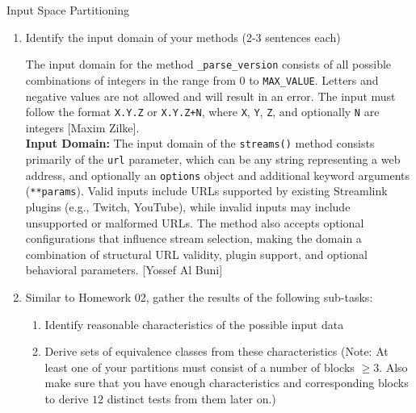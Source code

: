 \documentclass[a4paper]{scrreprt}
\newcounter{question}
\begin{document}
\begin{question}{Input Space Partitioning}
\begin{enumerate}[topsep=0pt, leftmargin=*]
\begin{answer}



          \end{answer}

    \item Identify the input domain of your methods (2-3 sentences each)
          \begin{answer}
      

The input domain for the method \texttt{\_parse\_version} consists of all possible combinations of integers in the range from 0 to \texttt{MAX\_VALUE}. Letters and negative values are not allowed and will result in an error. The input must follow the format \texttt{X.Y.Z} or \texttt{X.Y.Z+N}, where \texttt{X}, \texttt{Y}, \texttt{Z}, and optionally \texttt{N} are integers [Maxim Zilke]. \\


 \textbf{Input Domain:} The input domain of the \texttt{streams()} method consists primarily of the \texttt{url} parameter, which can be any string representing a web address, and optionally an \texttt{options} object and additional keyword arguments (\texttt{**params}). Valid inputs include URLs supported by existing Streamlink plugins (e.g., Twitch, YouTube), while invalid inputs may include unsupported or malformed URLs. The method also accepts optional configurations that influence stream selection, making the domain a combination of structural URL validity, plugin support, and optional behavioral parameters. [Yossef Al Buni]



          \end{answer}

    \item Similar to Homework 02, gather the results of the following sub-tasks:
          \begin{enumerate}
            \item Identify reasonable characteristics of the possible input data
            \item Derive sets of equivalence classes from these characteristics (Note: At least one of your partitions must consist of a number of blocks $\geq 3$. Also make sure that you have enough characteristics and corresponding blocks to derive $12$ distinct tests from them later on.)
          \end{enumerate}
          \begin{answer}
          


\end{answer}
\end{enumerate}
\end{question}
\end{document}
